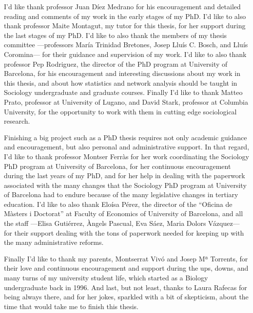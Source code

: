 I'd like thank professor Juan Díez Medrano for his encouragement and detailed reading and comments of my work in the early stages of my PhD. I'd like to also thank professor Maite Montagut, my tutor for this thesis, for her support during the last stages of my PhD. I'd like to also thank the members of my thesis committee ---professors María Trinidad Bretones, Josep Lluís C. Bosch, and Lluís Coromina--- for their guidance and supervision of my work. I'd like to also thank professor Pep Rodriguez, the director of the PhD program at University of Barcelona, for his encouragement and interesting discussions about my work in this thesis, and about how statistics and network analysis should be taught in Sociology undergraduate and graduate courses. Finally I'd like to thank Matteo Prato, professor at University of Lugano, and David Stark, professor at Columbia University, for the opportunity to work with them in cutting edge sociological research.

Finishing a big project such as a PhD thesis requires not only academic guidance and encouragement, but also personal and administrative support. In that regard, I'd like to thank professor Montser Ferràs for her work coordinating the Sociology PhD program at University of Barcelona, for her continuous encouragement during the last years of my PhD, and for her help in dealing with the paperwork associated with the many changes that the Sociology PhD program at University of Barcelona had to endure because of the many legislative changes in tertiary education. I'd like to also thank Eloísa Pérez, the director of the ``Oficina de Màsters i Doctorat'' at Faculty of Economics of University of Barcelona, and all the staff ---Elisa Gutiérrez, Àngels Pascual, Eva Sáez, Maria Dolors Vázquez--- for their support dealing with the tons of paperwork needed for keeping up with the many administrative reforms.

Finally I'd like to thank my parents, Montserrat Vivó and Josep Mª Torrents, for their love and continuous encouragement and support during the ups, downs, and many turns of my university student life, which started as a Biology undergraduate back in 1996. And last, but not least, thanks to Laura Rafecas for being always there, and for her jokes, sparkled with a bit of skepticism, about the time that would take me to finish this thesis.

\newpage
